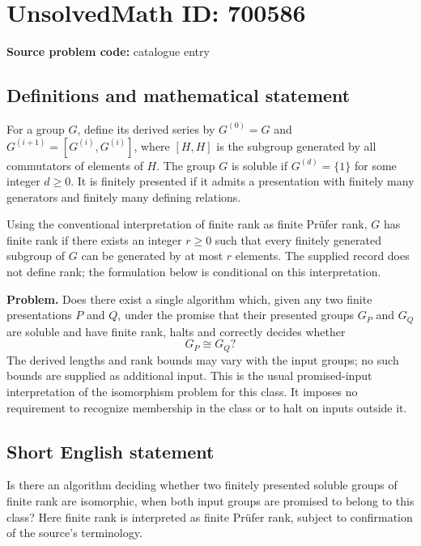\documentclass[11pt]{article}
\begin{document}
\section*{UnsolvedMath ID: 700586}
\textbf{Source problem code:} catalogue entry
\subsection{Definitions and mathematical statement}
For a group \(G\), define its derived series by \(G^{(0)}=G\) and \(G^{(i+1)}=[G^{(i)},G^{(i)}]\), where \([H,H]\) is the subgroup generated by all commutators of elements of \(H\). The group \(G\) is soluble if \(G^{(d)}=\{1\}\) for some integer \(d\geq 0\). It is finitely presented if it admits a presentation with finitely many generators and finitely many defining relations.

Using the conventional interpretation of finite rank as finite Pr\"ufer rank, \(G\) has finite rank if there exists an integer \(r\geq 0\) such that every finitely generated subgroup of \(G\) can be generated by at most \(r\) elements. The supplied record does not define rank; the formulation below is conditional on this interpretation.

\textbf{Problem.} Does there exist a single algorithm which, given any two finite presentations \(P\) and \(Q\), under the promise that their presented groups \(G_P\) and \(G_Q\) are soluble and have finite rank, halts and correctly decides whether
\[
G_P\cong G_Q?
\]
The derived lengths and rank bounds may vary with the input groups; no such bounds are supplied as additional input. This is the usual promised-input interpretation of the isomorphism problem for this class. It imposes no requirement to recognize membership in the class or to halt on inputs outside it.
\subsection{Short English statement}
Is there an algorithm deciding whether two finitely presented soluble groups of finite rank are isomorphic, when both input groups are promised to belong to this class? Here finite rank is interpreted as finite Pr\"ufer rank, subject to confirmation of the source's terminology.
\end{document}
